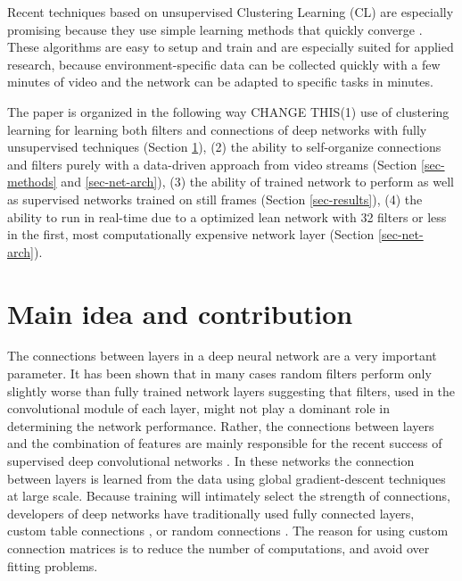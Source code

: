\documentclass{article} %
\begin{document}
Recent techniques based on unsupervised Clustering Learning (CL) are especially promising because they use 
simple learning methods that quickly converge \cite{culurciello2013clustering,coates_analysis_2011}. These 
algorithms are easy to setup and train and are especially suited for applied research, because environment-specific data 
can be collected quickly with a few minutes of video and the network can be adapted to specific tasks in minutes.

The paper is organized in the following way CHANGE THIS(1) use of clustering learning for learning both filters and connections of deep networks with fully unsupervised techniques (Section \ref{sec-main}), (2) the ability to self-organize connections and filters purely with a data-driven approach from video streams (Section \ref{sec-methods} and  \ref{sec-net-arch}), (3) the ability of trained network to perform as well as supervised networks trained on still frames (Section \ref{sec-results}), (4) the ability to run in real-time due to a optimized lean network with 32 filters or less in the first, most computationally expensive network layer (Section \ref{sec-net-arch}). 



\section{Main idea and contribution}
\label{sec-main}

The connections between layers in a deep neural network are a very important parameter. It has been shown that in 
many cases random filters perform only slightly worse than fully trained network layers \cite{saxe2011random} suggesting
 that filters, used in the convolutional module of each layer, might not play a dominant role in determining the network performance.
Rather, the connections between layers and the combination of features are mainly responsible for the recent success of 
supervised deep convolutional networks \cite{krizhevsky_imagenet_2012}. In these networks the connection between layers is
 learned from the data using global gradient-descent techniques at large scale. Because training will intimately select the strength of connections, 
 developers of deep networks have traditionally used fully connected layers, custom table connections \cite{lecun_gradient-based_1998}, or 
 random connections \cite{lecun_convolutional_2010}. The reason for using custom connection matrices 
 is to reduce the number of computations, and avoid over fitting problems.
 
\end{document}
